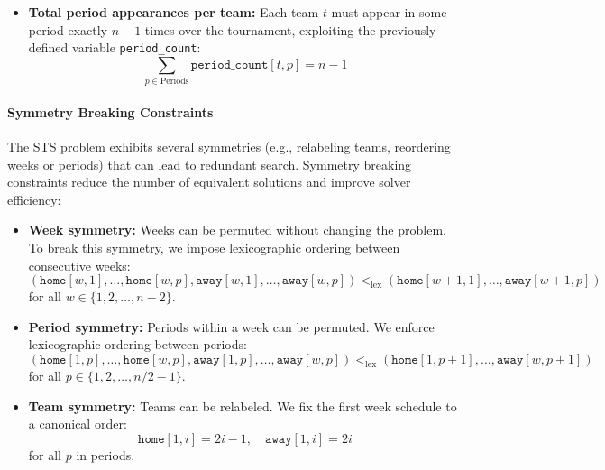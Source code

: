 \documentclass[11pt]{article}
\begin{document}
\begin{itemize}
\begin{itemize}
    \item \textbf{Total period appearances per team:}  
    Each team $t$ must appear in some period exactly $n - 1$ times over the tournament, exploiting the previously defined variable \texttt{period\_count}:
    \begin{equation*}
        \sum_{p \in \text{Periods}} \texttt{period\_count}[t, p] = n - 1
    \end{equation*}
\end{itemize}

\paragraph{Symmetry Breaking Constraints}

The STS problem exhibits several symmetries (e.g., relabeling teams, reordering weeks or periods) that can lead to redundant search. Symmetry breaking constraints reduce the number of equivalent solutions and improve solver efficiency:

\begin{itemize}
    \item \textbf{Week symmetry:}  
    Weeks can be permuted without changing the problem. To break this symmetry, we impose lexicographic ordering between consecutive weeks:
    \begin{equation*}
        (\texttt{home}[w,1], \ldots, \texttt{home}[w,p], \texttt{away}[w,1], \ldots, \texttt{away}[w,p]) <_{\text{lex}} (\texttt{home}[w+1,1], \ldots, \texttt{away}[w+1,p])
    \end{equation*}
    for all $w \in \{1, 2, \ldots, n-2\}$.

    \item \textbf{Period symmetry:}  
    Periods within a week can be permuted. We enforce lexicographic ordering between periods:
    \begin{equation*}
        (\texttt{home}[1,p], \ldots, \texttt{home}[w,p], \texttt{away}[1,p], \ldots, \texttt{away}[w,p]) <_{\text{lex}} (\texttt{home}[1,p+1], \ldots, \texttt{away}[w,p+1])
    \end{equation*}
    for all $p \in \{1, 2, \ldots, n/2-1\}$.

    \item \textbf{Team symmetry:}  
    Teams can be relabeled. We fix the first week schedule to a canonical order:
    \begin{equation*}
        \texttt{home}[1, i] = 2i - 1,\quad \texttt{away}[1, i] = 2i
    \end{equation*}
    for all $p$ in periods.
\end{itemize}


\end{itemize}
\end{document}
